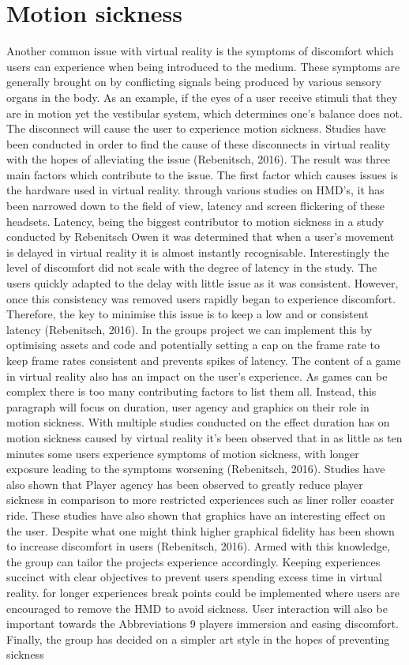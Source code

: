 \section{Motion sickness}
Another common issue with virtual reality is the symptoms of discomfort which users can experience when being introduced to the medium. These symptoms are generally brought on by conflicting signals being produced by various sensory organs in the body. As an example, if the eyes of a user receive stimuli that they are in motion yet the vestibular system, which determines one’s balance does not. The disconnect will cause the user to experience motion sickness. Studies have been conducted in order to find the cause of these disconnects in virtual reality with the hopes of alleviating the issue (Rebenitsch, 2016). The result was three main factors which contribute to the issue. The first factor which causes issues is the hardware used in virtual reality. through various studies on HMD’s, it has been narrowed down to the field of view, latency and screen flickering of these headsets. Latency, being the biggest contributor to motion sickness in a study conducted by Rebenitsch Owen it was determined that when a user’s movement is delayed in virtual reality it is almost instantly recognisable. Interestingly the level of discomfort did not scale with the degree of latency in the study. The users quickly adapted to the delay with little issue as it was consistent. However, once this consistency was removed users rapidly began to experience discomfort. Therefore, the key to minimise this issue is to keep a low and or consistent latency (Rebenitsch, 2016). In the groups project we can implement this by optimising assets and code and potentially setting a cap on the frame rate to keep frame rates consistent and prevents spikes of latency. The content of a game in virtual reality also has an impact on the user’s experience. As games can be complex there is too many contributing factors to list them all. Instead, this paragraph will focus on duration, user agency and graphics on their role in motion sickness. With multiple studies conducted on the effect duration has on motion sickness caused by virtual reality it’s been observed that in as little as ten minutes some users experience symptoms of motion sickness, with longer exposure leading to the symptoms worsening (Rebenitsch, 2016). Studies have also shown that Player agency has been observed to greatly reduce player sickness in comparison to more restricted experiences such as liner roller coaster ride. These studies have also shown that graphics have an interesting effect on the user. Despite what one might think higher graphical fidelity has been shown to increase discomfort in users (Rebenitsch, 2016). Armed with this knowledge, the group can tailor the projects experience accordingly. Keeping experiences succinct with clear objectives to prevent users spending excess time in virtual reality. for longer experiences break points could be implemented where users are encouraged to remove the HMD to avoid sickness. User interaction will also be important towards the Abbreviations 9 players immersion and easing discomfort. Finally, the group has decided on a simpler art style in the hopes of preventing sickness 

